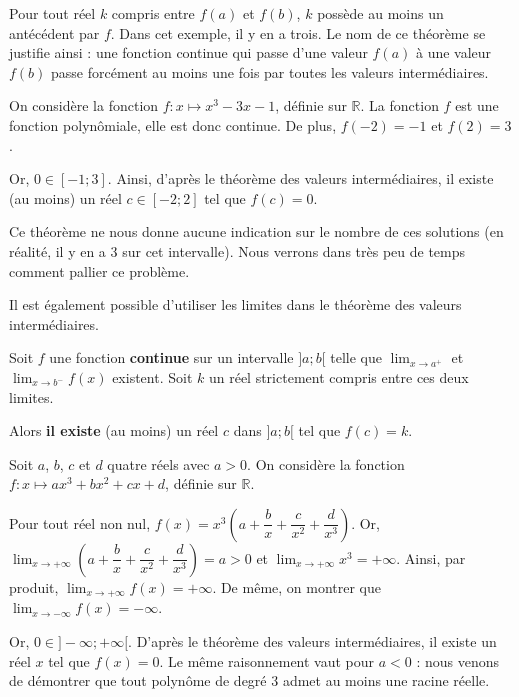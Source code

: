 \documentclass[11pt,fleqn, openany]{book} %
\begin{document}
Pour tout réel $k$ compris entre $f(a)$ et $f(b)$, $k$ possède au moins un antécédent par $f$. Dans cet exemple, il y en a trois. Le nom de ce théorème se justifie ainsi : une fonction continue qui passe d'une valeur $f(a)$ à une valeur $f(b)$ passe forcément au moins une fois par toutes les valeurs intermédiaires.




\begin{example} On considère la fonction $f:x\mapsto x^3-3x-1$, définie sur $\mathbb{R}$. La fonction $f$ est une fonction polynômiale, elle est donc continue. De plus, $f(-2)=-1$ et $f(2) = 3$.

Or, $0\in[-1;3]$. Ainsi, d'après le théorème des valeurs intermédiaires, il existe (au moins) un réel $c \in[-2;2]$ tel que $f(c)=0$.
\end{example}

Ce théorème ne nous donne aucune indication sur le nombre de ces solutions (en réalité, il y en a 3 sur cet intervalle). Nous verrons dans très peu de temps comment pallier ce problème.

Il est également possible d'utiliser les limites dans le théorème des valeurs intermédiaires.

\begin{theorem} Soit $f$ une fonction \textbf{continue} sur un intervalle $]a;b[$ telle que $\displaystyle\lim_{x \to a^+}$ et $\displaystyle\lim_{x\to b^-}f(x)$ existent. Soit $k$ un réel strictement compris entre ces deux limites.

Alors \textbf{il existe} (au moins) un réel $c$ dans $]a;b[$ tel que $f(c)=k$.\end{theorem}


\begin{example}Soit $a$, $b$, $c$ et $d$ quatre réels avec $a> 0$. On considère la fonction $f:x\mapsto ax^3+bx^2+cx+d$, définie sur $\mathbb{R}$.

Pour tout réel non nul, $f(x)=x^3\left(a+\dfrac{b}{x}+\dfrac{c}{x^2}+\dfrac{d}{x^3}\right)$. Or, $\displaystyle\lim_{x\to +\infty}\left(a+\dfrac{b}{x}+\dfrac{c}{x^2}+\dfrac{d}{x^3}\right)=a>0$ et $\displaystyle\lim_{x\to+\infty}x^3=+\infty$. Ainsi, par produit, $\displaystyle\lim_{x\to+\infty}f(x)=+\infty$. De même, on montrer que $\displaystyle\lim_{x\to -\infty}f(x)=-\infty$.

Or, $0\in ]-\infty;+\infty[$. D'après le théorème des valeurs intermédiaires, il existe un réel $x$ tel que $f(x)=0$. Le même raisonnement vaut pour $a<0$ : nous venons de démontrer que tout polynôme de degré 3 admet au moins une racine réelle.\end{example}
\end{document}
